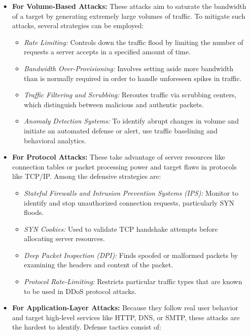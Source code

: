 \documentclass[conference]{IEEEtran}
\begin{document}
\begin{itemize}
    \item \textbf{For Volume-Based Attacks:}  
    These attacks aim to saturate the bandwidth of a target by generating extremely large volumes of traffic. To mitigate such attacks, several strategies can be employed:
    \begin{itemize}
        \item \textit{Rate Limiting:} Controls down the traffic flood by limiting the number of requests a server accepts in a specified amount of time.
        \item \textit{Bandwidth Over-Provisioning:} Involves setting aside more bandwidth than is normally required in order to handle unforeseen spikes in traffic.
        \item \textit{Traffic Filtering and Scrubbing:} Reroutes traffic via scrubbing centers, which distinguish between malicious and authentic packets.
        \item \textit{Anomaly Detection Systems:} To identify abrupt changes in volume and initiate an automated defense or alert, use traffic baselining and behavioral analytics.
    \end{itemize}

    \item \textbf{For Protocol Attacks:}  
    These take advantage of server resources like connection tables or packet processing power and target flaws in protocols like TCP/IP. Among the defensive strategies are:
    \begin{itemize}
        \item \textit{Stateful Firewalls and Intrusion Prevention Systems (IPS):} Monitor to identify and stop unauthorized connection requests, particularly SYN floods.
        \item \textit{SYN Cookies:} Used to validate TCP handshake attempts before allocating server resources.
        \item \textit{Deep Packet Inspection (DPI):} Finds spoofed or malformed packets by examining the headers and content of the packet.
        \item \textit{Protocol Rate-Limiting:} Restricts particular traffic types that are known to be used in DDoS protocol attacks.
    \end{itemize}

    \item \textbf{For Application-Layer Attacks:}  
    Because they follow real user behavior and target high-level services like HTTP, DNS, or SMTP, these attacks are the hardest to identify. Defense tactics consist of:


\end{itemize}
\end{document}
